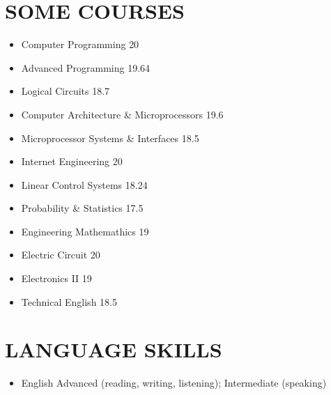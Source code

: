 \documentclass[10pt,a4paper,sans]{moderncv} %
\begin{document}
\section{SOME COURSES}

\begin{multicols}{2} 

	\begin{itemize}
	
		\item Computer Programming               		\hfill{20}  
		\item Advanced Programming                    \hfill{19.64}
		\item Logical Circuits                         \hfill{18.7}
		\item Computer Architecture \& Microprocessors \hfill{19.6}
		\item Microprocessor Systems \& Interfaces		\hfill{18.5}
		\item Internet Engineering						\hfill{20}
		\item Linear Control Systems                   \hfill{18.24}
		\item Probability \& Statistics				\hfill{17.5}  
		\item Engineering Mathemathics               \hfill{19}
		\item Electric Circuit                       	  		\hfill{20}   
		\item Electronics II                              		\hfill{19} 
		\item Technical English                               \hfill{18.5}
	
	\end{itemize}

\end{multicols}

\section{LANGUAGE SKILLS}

\begin{itemize}
	\item English \hspace{6 pt} Advanced (reading, writing, listening); Intermediate (speaking)
\end{itemize} 
\end{document}
